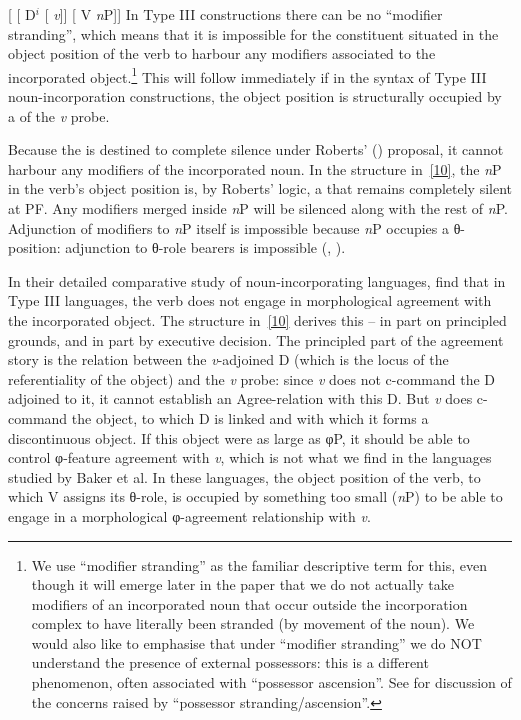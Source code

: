\documentclass[output=paper]{langsci/langscibook}
\begin{document}
\begin{refcontext}
\ea {}[ [ D$^i$ [ \hspace{-.4em}\emph{v}\tss{\{[+V], \Acc{}, \ldots{}\}}]] [ V \emph{n}P\tss{\{[+N]\}}]] \label{10}
\z
In Type III constructions there can be no \enquote{modifier stranding}, which means
that it is impossible for the constituent situated in the object position of
the verb to harbour any modifiers associated to the incorporated
object.\footnote{We use \enquote{modifier stranding} as the familiar descriptive
    term for this, even though it will emerge later in the paper that we do not
    actually take modifiers of an incorporated noun that occur outside the
    incorporation complex to have literally been stranded (by movement of the
    noun). We would also like to emphasise that under \enquote{modifier stranding}
    we do NOT understand the presence of external possessors: this is a
different phenomenon, often associated with \enquote{possessor ascension}. See
\citet[168]{bakeretal05} for discussion of the concerns raised by \enquote{possessor
stranding/ascension}.} This will follow immediately if in the syntax of Type
III noun-incorporation constructions, the object position is structurally
occupied by a  of the \emph{v} probe.

Because the  is destined to complete silence under  Roberts'
(\citeyear{Roberts2010}) proposal, it cannot harbour any modifiers of the
incorporated noun. In the structure in~\eqref{10}, the \emph{n}P in the verb's
object position is, by Roberts' logic, a  that remains completely
silent at PF. Any modifiers merged inside \emph{n}P will be silenced along with
the rest of \emph{n}P. Adjunction of modifiers to \emph{n}P itself is
impossible because \emph{n}P occupies a θ{}-position: adjunction to
θ{}-role bearers is impossible (\citealt[6]{Chomsky1986},
\citealt[57]{mccloskey96}).

In their detailed comparative study of noun-incorporating languages,
\citet{bakeretal05} find that in Type III languages, the verb does not engage in
morphological agreement with the incorporated object. The structure in~\eqref{10}
derives this -- in part on principled grounds, and in part by executive
decision. The principled part of the agreement story is the relation between
the \emph{v}-adjoined D (which is the locus of the referentiality of the
object) and the \emph{v} probe: since \emph{v} does not c-command the D
adjoined to it, it cannot establish an Agree-relation with this D. But \emph{v}
does c-command the object, to which D is linked and with which it forms a
discontinuous object. If this object were as large as φ{}P, it should be
able to control φ{}-feature agreement with \emph{v}, which is not what
we find in the languages studied by Baker et al. In these languages, the object
position of the verb, to which V assigns its θ{}-role, is occupied by
something too small (\emph{n}P) to be able to engage in a morphological
φ{}-agreement relationship with \emph{v}.


\end{refcontext}
\end{document}
